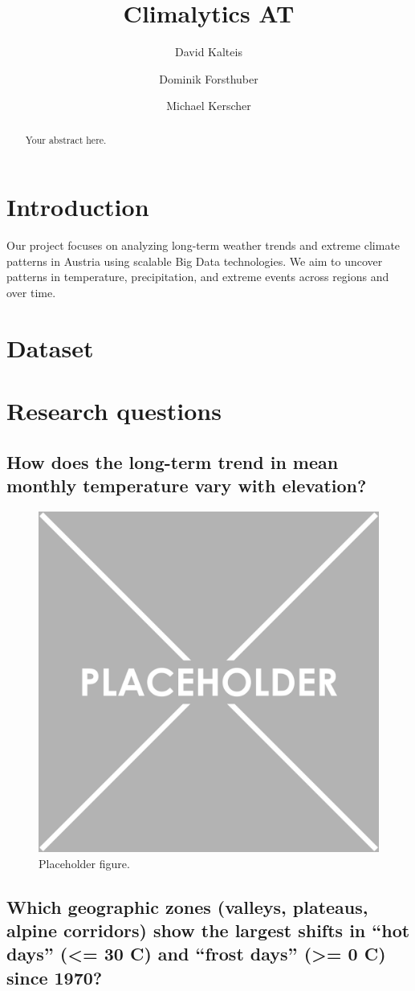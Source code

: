 \documentclass[sigconf]{acmart}
\title{Climalytics AT}
\author{David Kalteis}
\affiliation{\institution{FH Hagenberg}\department{Mobile Computing}\country{Austria}}
\author{Dominik Forsthuber}
\affiliation{\institution{FH Hagenberg}\department{Mobile Computing}\country{Austria}}
\author{Michael Kerscher}
\affiliation{\institution{FH Hagenberg}\department{Mobile Computing}\country{Austria}}
\begin{document}
\begin{abstract}
Your abstract here.
\end{abstract}

\maketitle

\section{Introduction}
Our project focuses on analyzing long-term weather trends and extreme climate patterns in Austria using scalable Big Data technologies. We aim to uncover patterns in temperature, precipitation, and extreme events across regions and over time.

\section{Dataset}


\section{Research questions}
\subsection{How does the long-term trend in mean monthly temperature vary with elevation?}


\begin{figure}[H]
  \centering
  \includegraphics[width=0.4\linewidth]{img/placeholder.png}
  \caption{Placeholder figure.}
  \label{fig:placeholder}
\end{figure}


\subsection{Which geographic zones (valleys, plateaus, alpine corridors) show the largest shifts in “hot days” (<= 30 C) and “frost days” (>= 0 C) since 1970?}

\end{document}
